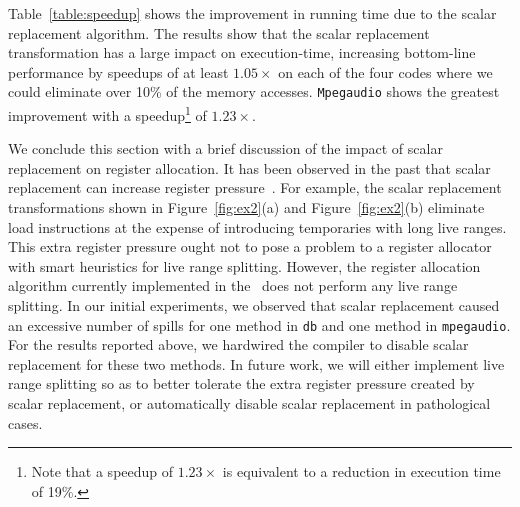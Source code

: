 
Table~\ref{table:speedup} shows the improvement in running time due
to the scalar replacement algorithm.  The results show that the
scalar replacement transformation has a large impact on execution-time,
increasing bottom-line performance by speedups of at least
$1.05\times$ on each of the 
four codes where we could eliminate over 10\% of the memory accesses.
{\tt Mpegaudio} shows the greatest improvement with a 
speedup\footnote{Note that a speedup of $1.23\times$ is equivalent to
a reduction in execution time of 19\%.} of $1.23\times$.

We conclude this section with a brief discussion of the impact of
scalar replacement on register allocation.  It has been observed in
the past that scalar replacement can increase register
pressure~\cite{CaKe94}.  For example, the scalar replacement
transformations shown in Figure~\ref{fig:ex2}(a) and
Figure~\ref{fig:ex2}(b) eliminate load instructions at the expense of
introducing temporaries with long live ranges.  This extra register
pressure ought not to pose a problem to a register allocator with
smart heuristics for live range splitting.  However, the register
allocation algorithm currently implemented in the \joc\ does not
perform any live range splitting.  In our initial experiments, we
observed that scalar replacement caused an excessive number of spills
for one method in {\tt db} and one method in {\tt mpegaudio}.  For the
results reported above, we hardwired the compiler to disable scalar
replacement for these two methods.  In future work, we will either
implement live range splitting so as to better tolerate the extra
register pressure created by scalar replacement, or automatically
disable scalar replacement in pathological cases.

